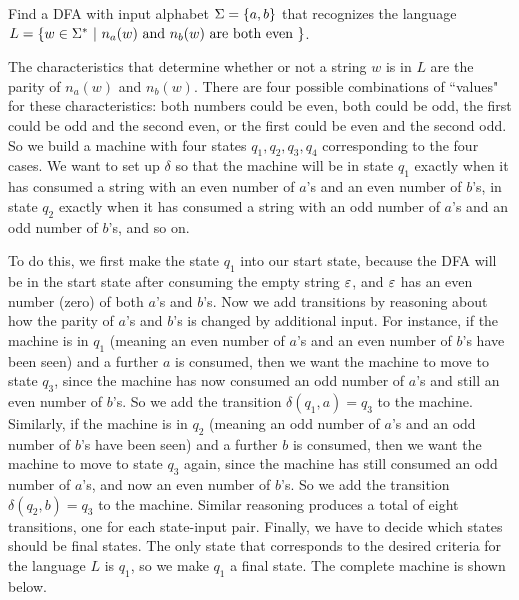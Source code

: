 \begin{example}
Find a DFA with input alphabet $\Sigma = \mbox{$\{a,b\}$}$ that recognizes the language
$L= \{w \in \Sigma^* \ | \ n_a(w) \mbox{ and } n_b(w) \mbox{ are both even } \}$.

The characteristics that determine whether or not a string $w$ is in $L$ are the
parity of $n_a(w)$ and $n_b(w)$.  There are four possible combinations of
``values" for these characteristics: both numbers could be even, both could be
odd, the first could be odd and the second even, or the first could be even and
the second odd.  So we build a machine with four states $q_1, q_2, q_3, q_4$
corresponding to the four cases.  We want to set up $\delta$ so that the machine
will be in state $q_1$ exactly when it has consumed a string with an even number
of $a$'s and an even number of $b$'s, in state $q_2$ exactly when it has 
consumed a string with an
odd number of $a$'s and an odd number of $b$'s, and so on.  

To do this, we first make 
the state $q_1$ into our start state,
because the DFA will be in the start state after consuming the empty string
$\varepsilon$, and $\varepsilon$ has an even number (zero) of both $a$'s and $b$'s.  Now we
add transitions by reasoning about how the parity of $a$'s and $b$'s is changed
by additional input.  For instance, if the machine is in $q_1$ (meaning an even
number of $a$'s and an even number of $b$'s have been seen) and a further $a$ is
consumed, then we want the machine to move to state $q_3$, since the machine has
now consumed an odd number of $a$'s and still an even number of $b$'s.  So we add
the transition $\delta(q_1, a) = q_3$ to the machine.  Similarly, if the machine
is in $q_2$ (meaning an odd
number of $a$'s and an odd number of $b$'s have been seen) and a further $b$ is
consumed, then we want the machine to move to state $q_3$ again, since the 
machine has
still consumed an odd number of $a$'s, and now an even number of $b$'s.
So we add
the transition $\delta(q_2, b) = q_3$ to the machine.  Similar reasoning produces
a total of eight transitions, one for each state-input pair.  Finally, we have to
decide which states should be final states.  The only state that corresponds to
the desired criteria for the language $L$ is $q_1$, so we make $q_1$ a final
state.  The complete machine is shown below.




\end{example}

